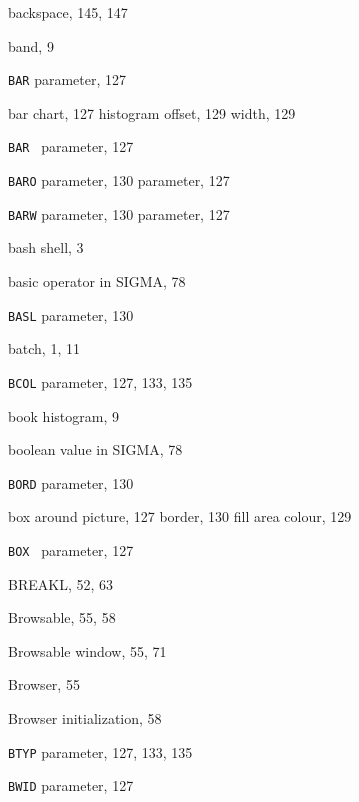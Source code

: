 \begin{theindex}
  \indexspace

  \item backspace, 145, 147
  \item band, 9
  \item {\tt BAR}
     parameter, 127
  \item bar
    \subitem chart, 127
    \subitem histogram
      \subsubitem offset, 129
      \subsubitem width, 129
  \item {\tt BAR }
     parameter, 127
  \item {\tt BARO}
     parameter, 130
     parameter, 127
  \item {\tt BARW}
     parameter, 130
     parameter, 127
  \item bash shell, 3
  \item basic operator in SIGMA, 78
  \item {\tt BASL}
     parameter, 130
  \item batch, 1, 11
  \item {\tt BCOL}
     parameter, 127, 133, 135
  \item book histogram, 9
  \item boolean value in SIGMA, 78
  \item {\tt BORD}
     parameter, 130
  \item box
    \subitem around picture, 127
    \subitem border, 130
    \subitem fill area
      \subsubitem colour, 129
  \item {\tt BOX }
     parameter, 127
  \item {\ttfamily  BREAKL}, 52, 63
  \item Browsable, 55, 58
  \item Browsable window, 55, 71
  \item Browser, 55
  \item Browser initialization, 58
  \item {\tt BTYP}
     parameter, 127, 133, 135
  \item {\tt BWID}
     parameter, 127

  \indexspace


\end{theindex}
